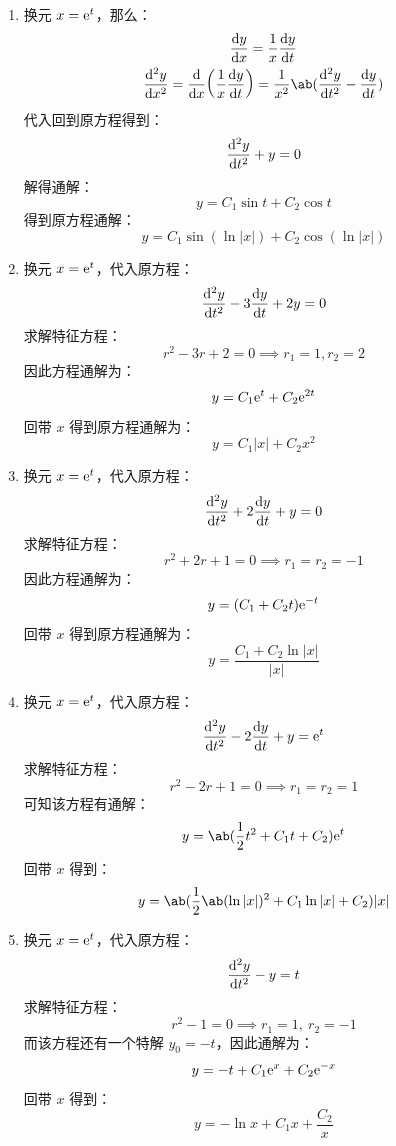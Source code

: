 \begin{problem}
    \begin{solution}
        \begin{enumerate}
            \item[\textbf{1)}] 换元 $x = \mathrm{e}^{t}$，那么：
            $$
            \begin{gathered}
                \dv{y}{x} = \frac{1}{x} \dv{y}{t} \\
                \dv[2]{y}{x} = \dv{x}(\frac{1}{x} \dv{y}{t}) = \frac{1}{x^2} \ab(\dv[2]{y}{t} - \dv{y}{t})
            \end{gathered}
            $$
            代入回到原方程得到：
            $$
            \dv[2]{y}{t} + y = 0
            $$
            解得通解：
            $$
            y = C_1 \sin t + C_2 \cos t
            $$
            得到原方程通解：
            $$
            y = C_1 \sin (\ln |x|) + C_2 \cos (\ln |x|)
            $$

            \item[\textbf{2)}] 换元 $x = \mathrm{e}^{t}$，代入原方程：
            $$
            \dv[2]{y}{t} - 3\dv{y}{t} + 2y = 0
            $$
            求解特征方程：
            $$
            r^2 - 3r + 2 = 0 \implies r_1 = 1, r_2 = 2
            $$
            因此方程通解为：
            $$
            y = C_1 \mathrm{e}^{t} + C_2 \mathrm{e}^{2t}
            $$
            回带 $x$ 得到原方程通解为：
            $$
            y = C_1 |x| + C_2 x^2
            $$

            \item[\textbf{3）}] 换元 $x = \mathrm{e}^{t}$，代入原方程：
            $$
            \dv[2]{y}{t} + 2 \dv{y}{t} + y = 0
            $$
            求解特征方程：
            $$
            r^2 + 2r + 1 = 0 \implies r_1 = r_2 = -1
            $$
            因此方程通解为：
            $$
            y = (C_1 + C_2 t) \mathrm{e}^{-t}
            $$
            回带 $x$ 得到原方程通解为：
            $$
            y = \frac{C_1 + C_2 \ln |x|}{|x|}
            $$

            \item[\textbf{4)}] 换元 $x = \mathrm{e}^{t}$，代入原方程：
            $$
            \dv[2]{y}{t} - 2\dv{y}{t} + y = \mathrm{e}^{t}
            $$
            求解特征方程：
            $$
            r^2 - 2r + 1 = 0 \implies r_1 = r_2 = 1
            $$
            可知该方程有通解：
            $$
            y = \ab(\frac{1}{2} t^2 + C_1 t + C_2) \E^{t}
            $$
            回带 $x$ 得到：
            $$
            y = \ab(\frac{1}{2} \ab(\ln |x|)^2 + C_1 \ln |x| + C_2) |x|
            $$
            
            \item[\textbf{5)}] 换元 $x = \mathrm{e}^{t}$，代入原方程：
            $$
            \dv[2]{y}{t} - y = t
            $$
            求解特征方程：
            $$
            r^2 - 1 = 0 \implies r_1 = 1,\ r_2 = -1
            $$
            而该方程还有一个特解 $y_0 = -t$，因此通解为：
            $$
            y = -t + C_1 \mathrm{e}^{x} + C_2 \mathrm{e}^{-x}
            $$
            回带 $x$ 得到：
            $$
            y = -\ln x + C_1 x + \frac{C_2}{x}
            $$
        \end{enumerate}
    \end{solution}
\end{problem}